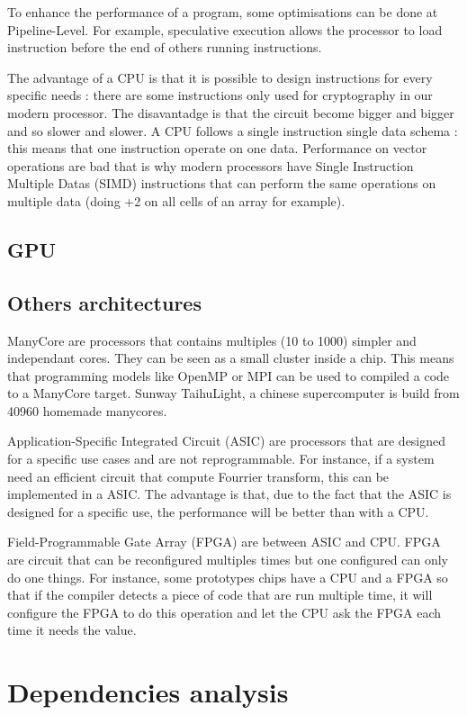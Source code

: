 
To enhance the performance of a program, some optimisations can be done at Pipeline-Level. For example, speculative execution allows the processor to load instruction before the end of others running instructions. 

The advantage of a CPU is that it is possible to design instructions for every specific needs : there are some instructions only used for cryptography in our modern processor. The disavantadge is that the circuit become bigger and bigger and so slower and slower. A CPU follows a single instruction single data  schema : this means that one instruction operate on one data. Performance on vector operations are bad that is why modern processors have Single Instruction Multiple Datas (SIMD) instructions that can perform the same operations on multiple data (doing +2 on all cells of an array for example).

\subsection{GPU}

\subsection{Others architectures}
ManyCore are processors that contains multiples (10 to 1000) simpler and independant cores. They can be seen as a small cluster inside a chip. This means that programming models like OpenMP or MPI can be used to compiled a code to a ManyCore target. Sunway TaihuLight, a chinese supercomputer is build from 40960 homemade manycores.

Application-Specific Integrated Circuit (ASIC) are processors that are designed for a specific use cases and are not reprogrammable. For instance, if a system need an efficient circuit that compute Fourrier transform, this can be implemented in a ASIC. The advantage is that, due to the fact that the ASIC is designed for a specific use, the performance will be better than with a CPU.

Field-Programmable Gate Array (FPGA) are between ASIC and CPU. FPGA are circuit that can be reconfigured multiples times but one configured can only do one things. For instance, some prototypes chips have a CPU and a FPGA so that if the compiler detects a piece of code that are run multiple time, it will configure the FPGA to do this operation and let the CPU ask the FPGA each time it needs the value.  

\section{Dependencies analysis}
